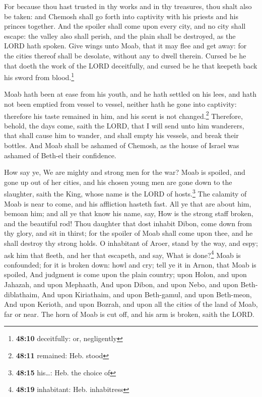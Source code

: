  For because thou hast trusted in thy works and in thy
treasures, thou shalt also be taken: and Chemosh shall go forth into
captivity with his priests and his princes together.  And
the spoiler shall come upon every city, and no city shall escape: the
valley also shall perish, and the plain shall be destroyed, as the LORD
hath spoken.  Give wings unto Moab, that it may flee and
get away: for the cities thereof shall be desolate, without any to dwell
therein.  Cursed be he that doeth the work of the LORD
deceitfully, and cursed be he that keepeth back his sword from
blood.\footnote{\textbf{48:10} deceitfully: or, negligently}

 Moab hath been at ease from his youth, and he hath
settled on his lees, and hath not been emptied from vessel to vessel,
neither hath he gone into captivity: therefore his taste remained in
him, and his scent is not changed.\footnote{\textbf{48:11} remained:
  Heb. stood}  Therefore, behold, the days come, saith
the LORD, that I will send unto him wanderers, that shall cause him to
wander, and shall empty his vessels, and break their bottles.
 And Moab shall be ashamed of Chemosh, as the house of
Israel was ashamed of Beth-el their confidence.

 How say ye, We are mighty and strong men for the war?
 Moab is spoiled, and gone up out of her cities, and his
chosen young men are gone down to the slaughter, saith the King, whose
name is the LORD of hosts.\footnote{\textbf{48:15} his\ldots: Heb. the
  choice of}  The calamity of Moab is near to come, and
his affliction hasteth fast.  All ye that are about him,
bemoan him; and all ye that know his name, say, How is the strong staff
broken, and the beautiful rod!  Thou daughter that dost
inhabit Dibon, come down from thy glory, and sit in thirst; for the
spoiler of Moab shall come upon thee, and he shall destroy thy strong
holds.  O inhabitant of Aroer, stand by the way, and
espy; ask him that fleeth, and her that escapeth, and say, What is
done?\footnote{\textbf{48:19} inhabitant: Heb. inhabitress}
 Moab is confounded; for it is broken down: howl and cry;
tell ye it in Arnon, that Moab is spoiled,  And judgment
is come upon the plain country; upon Holon, and upon Jahazah, and upon
Mephaath,  And upon Dibon, and upon Nebo, and upon
Beth-diblathaim,  And upon Kiriathaim, and upon
Beth-gamul, and upon Beth-meon,  And upon Kerioth, and
upon Bozrah, and upon all the cities of the land of Moab, far or near.
 The horn of Moab is cut off, and his arm is broken,
saith the LORD.

